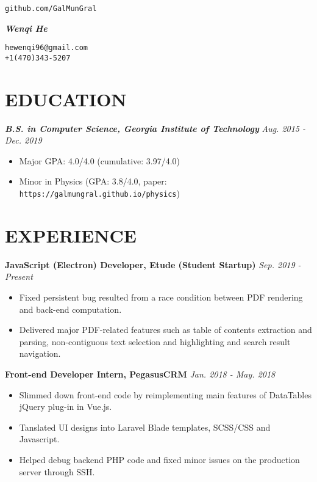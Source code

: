 \documentclass[11pt]{article}
\begin{document}
\noindent
\parbox{0.25\textwidth}{\hfill\texttt{github.com/GalMunGral}}
\parbox{0.5\textwidth}{\centerline{\Huge\slshape\bfseries Wenqi He}}
\parbox{0.25\textwidth}{\texttt{hewenqi96@gmail.com\\+1(470)343-5207}}

\section*{EDUCATION}
\textbf{\itshape B.S. in Computer Science, Georgia Institute of Technology} \hfill \textit{Aug. 2015 - Dec. 2019}
\begin{itemize}[leftmargin=15pt, noitemsep, topsep=0pt]
	\item Major GPA: 4.0/4.0 (cumulative: 3.97/4.0)
	\item Minor in Physics (GPA: 3.8/4.0, paper: \texttt{https://galmungral.github.io/physics})
\end{itemize}
%
\section*{EXPERIENCE}
\textbf{JavaScript (Electron) Developer, Etude (Student Startup)} \hfill \textit{Sep. 2019 - Present}
\begin{itemize}[leftmargin=15pt, noitemsep, topsep=0pt]
\item Fixed persistent bug resulted from a race condition between PDF rendering and back-end computation.
\item Delivered major PDF-related features such as table of contents extraction and parsing, non-contiguous text selection and highlighting and search result navigation.
\end{itemize}
\vspace{1em}
\textbf{Front-end Developer Intern, PegasusCRM} \hfill \textit{Jan. 2018 - May. 2018}
\begin{itemize}[leftmargin=15pt, noitemsep, topsep=0pt]
	\item Slimmed down front-end code by reimplementing main features of DataTables jQuery plug-in in Vue.js.
	\item Tanslated UI designs into Laravel Blade templates, SCSS/CSS and Javascript.
	\item Helped debug backend PHP code and fixed minor issues on the production server through SSH.
\end{itemize}
\vspace{-0.5em}
%
\end{document}
